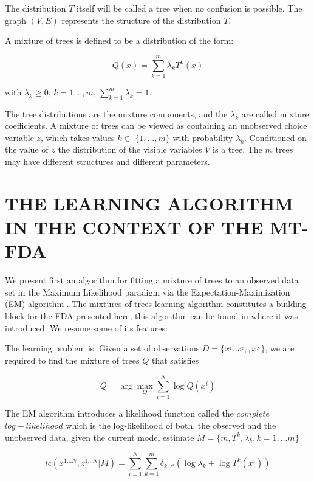 \documentclass[10pt,thmsa]{article}
\begin{document}
The distribution $T$ itself will be called a tree when no confusion is
possible. The graph $(V,E)$ represents the structure of the distribution $T$.

A mixture of trees is defined to be a distribution of the form:

\begin{equation}
Q(x)=\sum\limits_{k=1}^m\lambda _kT^k(x)  \label{Q-Mixture}
\end{equation}

with $\lambda _k\geq 0$, $k=1,..,m$, $\sum_{k=1}^m\lambda _k=1$.

The tree distributions are the mixture components, and the $\lambda _k$ are
called mixture coefficients. A mixture of trees can be viewed as containing
an unobserved choice variable $z$, which takes values $k\in $ $\{1,...,m\}$
with probability $\lambda _k$. Conditioned on the value of $z$ the
distribution of the visible variables $V$ is a tree. The $m$ trees may have
different structures and different parameters.

\section{THE LEARNING ALGORITHM IN THE CONTEXT OF THE MT-FDA}

We present first an algorithm for fitting a mixture of trees to an observed
data set in the Maximum Likelihood paradigm via the Expectation-Maximization
(EM) algorithm \citep{Dempster_et_al:1977}. The mixtures of trees learning
algorithm constitutes a building block for the FDA presented here, this
algorithm can be found in \citep{Meila:1999} where it was introduced. We
resume some of its features:

The learning problem is: Given a set of observations $D=%
\{x^{_1},x^{_2},,x^{_N}\}$, we are required to find the mixture of trees $Q$
that satisfies

\begin{equation}
Q=\arg \max_Q\sum\limits_{i=1}^N\log Q(x^i)  \label{argmax}
\end{equation}

The EM algorithm introduces a likelihood function called the $complete$ $%
log-likelihood$ which is the log-likelihood of both, the observed and the
unobserved data, given the current model estimate $M=\{m,T^k,\lambda
_k,k=1,...m\}$

\begin{equation}
lc(x^{1...N},z^{1...N}|M)=\sum_{i=1}^N\sum_{k=1}^m\delta _{k,z^i}(\log
\lambda _k+\log T^k(x^i))  \label{likehood-extended}
\end{equation}
\end{document}
